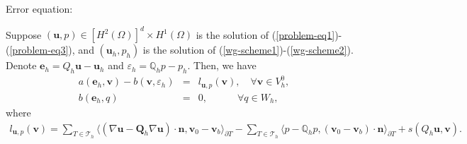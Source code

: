 \documentclass[leqno]{siamltex704}
\numberwithin{equation}{section}
\def\dQ{{\mathbb{Q}}}
\def\bQ{{\mathbf{Q}}}
\def\sumT{\sum_{T\in\mathcal{T}_h}}     %
\def\la{\langle}
\def\ra{\rangle_{\partial T}}
\def\e{\varepsilon}
\def\bu{{\mathbf{u}}}
\def\bv{{\mathbf{v}}}
\def\bn{{\mathbf{n}}}
\def\be{{\mathbf{e}}}
\begin{document}
Error equation:
\begin{lemma}
  Suppose $(\bu,p)\in [H^2(\Omega)]^d\times H^1(\Omega)$ is the solution of (\ref{problem-eq1})-
  (\ref{problem-eq3}), and $(\bu_h,p_h)$ is the solution of (\ref{wg-scheme1})-(\ref{wg-scheme2}).
  Denote $\be_h = Q_h\bu-\bu_h$ and $\e_h=\dQ_h p-p_h$.
  Then, we have
  \begin{eqnarray} \label{err-eqn1}
    a(\be_h,\bv)-b(\bv,\e_h) &=& l_{\bu,p}(\bv),\quad\forall\bv\in V_h^0,
    \\ \label{err-eqn2}
    b(\be_h,q) &=& 0,\quad\quad\quad\forall q\in W_h,
  \end{eqnarray}
  where
  \begin{eqnarray*}
    l_{\bu,p}(\bv)=\sumT\la (\nabla\bu-\bQ_h\nabla\bu)\cdot\bn,\bv_0-\bv_b\ra - \sumT\la p-\dQ_h p,(\bv_0-\bv_b)\cdot\bn\ra + s(Q_h\bu,\bv).
  \end{eqnarray*}
\end{lemma}
\end{document}
